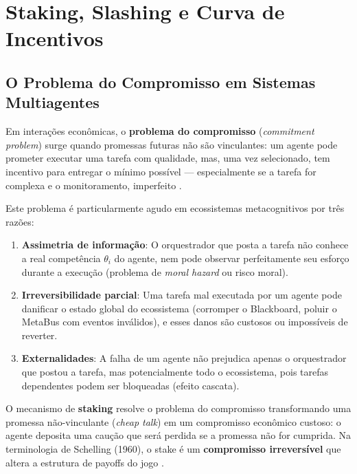 \section{Staking, Slashing e Curva de Incentivos}

\subsection{O Problema do Compromisso em Sistemas Multiagentes}

Em interações econômicas, o \textbf{problema do compromisso} (\textit{commitment problem}) surge quando promessas futuras não são vinculantes: um agente pode prometer executar uma tarefa com qualidade, mas, uma vez selecionado, tem incentivo para entregar o mínimo possível --- especialmente se a tarefa for complexa e o monitoramento, imperfeito \cite{schelling1960strategy, williamson1985economic}.

Este problema é particularmente agudo em ecossistemas metacognitivos por três razões:

\begin{enumerate}
    \item \textbf{Assimetria de informação}: O orquestrador que posta a tarefa não conhece a real competência $\theta_i$ do agente, nem pode observar perfeitamente seu esforço durante a execução (problema de \textit{moral hazard} ou risco moral).
    
    \item \textbf{Irreversibilidade parcial}: Uma tarefa mal executada por um agente pode danificar o estado global do ecossistema (corromper o Blackboard, poluir o MetaBus com eventos inválidos), e esses danos são custosos ou impossíveis de reverter.
    
    \item \textbf{Externalidades}: A falha de um agente não prejudica apenas o orquestrador que postou a tarefa, mas potencialmente todo o ecossistema, pois tarefas dependentes podem ser bloqueadas (efeito cascata).
\end{enumerate}

O mecanismo de \textbf{staking} resolve o problema do compromisso transformando uma promessa não-vinculante (\textit{cheap talk}) em um compromisso econômico custoso: o agente deposita uma caução que será perdida se a promessa não for cumprida. Na terminologia de Schelling (1960), o stake é um \textbf{compromisso irreversível} que altera a estrutura de payoffs do jogo \cite{schelling1960strategy}.

